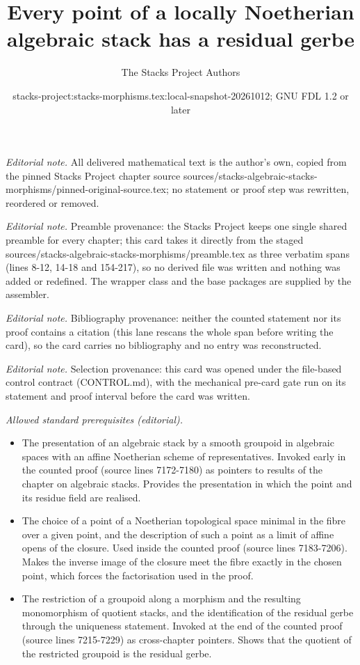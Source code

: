 \documentclass[10pt,a4paper]{amsart}
\title{Every point of a locally Noetherian algebraic stack has a residual gerbe}
\author{The Stacks Project Authors}
\date{stacks-project:stacks-morphisms.tex:local-snapshot-20261012; GNU FDL 1.2 or later}
\theoremstyle{plain}
\theoremstyle{definition}
\theoremstyle{remark}
\numberwithin{equation}{subsection}
\begin{document}
\maketitle
\noindent\textit{Editorial note.} All delivered mathematical text is the author's own, copied from the pinned Stacks Project chapter source sources/stacks-algebraic-stacks-morphisms/pinned-original-source.tex; no statement or proof step was rewritten, reordered or removed.\par\medskip
\noindent\textit{Editorial note.} Preamble provenance: the Stacks Project keeps one single shared preamble for every chapter; this card takes it directly from the staged sources/stacks-algebraic-stacks-morphisms/preamble.tex as three verbatim spans (lines 8-12, 14-18 and 154-217), so no derived file was written and nothing was added or redefined. The wrapper class and the base packages are supplied by the assembler.\par\medskip
\noindent\textit{Editorial note.} Bibliography provenance: neither the counted statement nor its proof contains a citation (this lane rescans the whole span before writing the card), so the card carries no bibliography and no entry was reconstructed.\par\medskip
\noindent\textit{Editorial note.} Selection provenance: this card was opened under the file-based control contract (CONTROL.md), with the mechanical pre-card gate run on its statement and proof interval before the card was written.\par\medskip
\noindent\textit{Allowed standard prerequisites (editorial).}\begin{itemize}
\item The presentation of an algebraic stack by a smooth groupoid in algebraic spaces with an affine Noetherian scheme of representatives. Invoked early in the counted proof (source lines 7172-7180) as pointers to results of the chapter on algebraic stacks. Provides the presentation in which the point and its residue field are realised.
\item The choice of a point of a Noetherian topological space minimal in the fibre over a given point, and the description of such a point as a limit of affine opens of the closure. Used inside the counted proof (source lines 7183-7206). Makes the inverse image of the closure meet the fibre exactly in the chosen point, which forces the factorisation used in the proof.
\item The restriction of a groupoid along a morphism and the resulting monomorphism of quotient stacks, and the identification of the residual gerbe through the uniqueness statement. Invoked at the end of the counted proof (source lines 7215-7229) as cross-chapter pointers. Shows that the quotient of the restricted groupoid is the residual gerbe.
\end{itemize}\medskip
\end{document}
